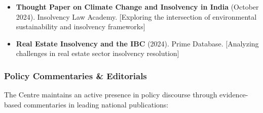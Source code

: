 \documentclass[11pt,a4paper]{article}
\begin{document}
\vspace{0.3cm}

\begin{itemize}[leftmargin=*,itemsep=0.2cm]
    \item \textbf{Thought Paper on Climate Change and Insolvency in India} (October 2024). Insolvency Law Academy. [Exploring the intersection of environmental sustainability and insolvency frameworks]

    \item \textbf{Real Estate Insolvency and the IBC} (2024). Prime Database. [Analyzing challenges in real estate sector insolvency resolution]
\end{itemize}

\clearpage

\subsubsection*{Policy Commentaries \& Editorials}

The Centre maintains an active presence in policy discourse through evidence-based commentaries in leading national publications:

\vspace{0.3cm}
\end{document}
